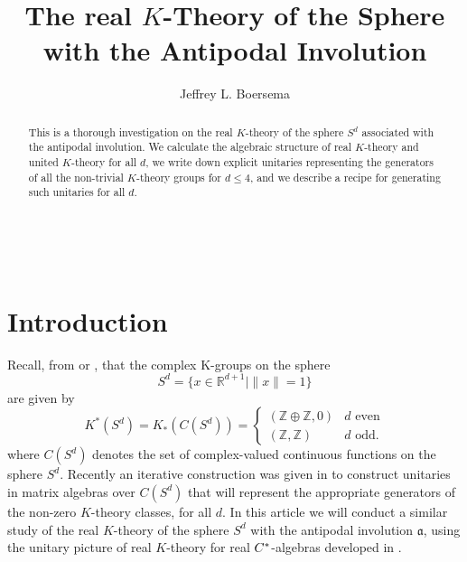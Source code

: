 \documentclass[12pt, reqno]{amsart}
\theoremstyle{definition}
\def\R{{\mathbb R}}
\def\Z{{\mathbb Z}}
\newcommand{\fa}{\mathfrak a}
\begin{document}
~


\vspace{-1cm}

\title{The real {$K$}-Theory of the Sphere with the Antipodal Involution} 
\author{Jeffrey L. Boersema}
\begin{abstract}
This is a thorough investigation on the real $K$-theory of the sphere $S^d$ associated with the antipodal involution. We calculate the algebraic structure of real $K$-theory and united $K$-theory for all $d$, we write down explicit unitaries representing the generators of all the non-trivial $K$-theory groups for $d \leq 4$, and we describe a recipe for generating such unitaries for all $d$.
\end{abstract}

\maketitle





\section{Introduction}

Recall, from \cite{blackadarbook} or \cite{parkbook}, that the complex K-groups on the sphere 
$$S^d = \{x \in \R^{d+1} \mid \| x \| = 1\}$$ are given by
$$K^*(S^d) = K_*(C(S^d)) =  \begin{cases} ( \Z \oplus \Z, 0) & \text{$d$ even} \\  ( \Z , \Z) & \text{$d$ odd.}
	\end{cases} $$
where $C(S^d)$ denotes the set of complex-valued continuous functions on the sphere $S^d$. Recently an iterative construction was given in \cite{SBS} to construct unitaries in matrix algebras over $C(S^d)$ that will represent the appropriate generators of the non-zero $K$-theory classes, for all $d$. In this article we will conduct a similar study of the real $K$-theory of the sphere $S^d$ with the antipodal involution $\fa$, using the unitary picture of real $K$-theory for real $C \sp *$-algebras developed in \cite{BL}.
\end{document}

